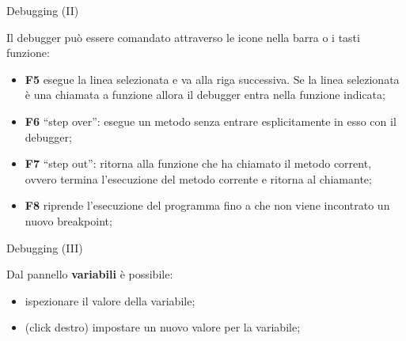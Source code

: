 \begin{frame}{Debugging (II)}

  Il debugger pu\`o essere comandato attraverso le icone nella barra o i tasti funzione:
  \begin{itemize}
    \item \textbf{F5} esegue la linea selezionata e va alla riga successiva. Se la linea selezionata \`e una chiamata a funzione allora il debugger entra nella funzione indicata;
    \item \textbf{F6} ``step over'': esegue un metodo senza entrare esplicitamente in esso con il debugger;
    \item \textbf{F7} ``step out'': ritorna alla funzione che ha chiamato il metodo corrent, ovvero termina l'esecuzione del metodo corrente e ritorna al chiamante;
    \item \textbf{F8} riprende l'esecuzione del programma fino a che non viene incontrato un nuovo breakpoint;
  \end{itemize}

\end{frame}

\begin{frame}{Debugging (III)}

  Dal pannello \textbf{variabili} è possibile:
  \begin{itemize}
    \item ispezionare il valore della variabile;
    \item (click destro) impostare un nuovo valore per la variabile;
  \end{itemize}

\end{frame}
